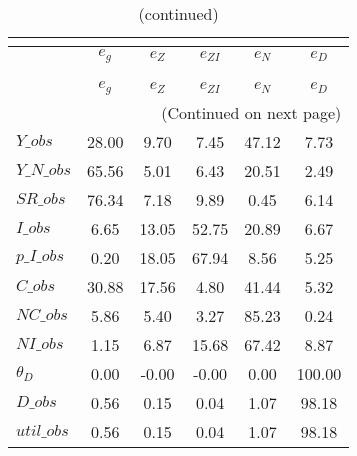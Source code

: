  
\begin{center}
\begin{longtable}{lccccc} 
\caption{VARIANCE DECOMPOSITION (in percent)}\\
 \label{Table:th_var_decomp_uncond}\\
\toprule 
$            $	 & 	 $       {e_g}$	 & 	 $       {e_Z}$	 & 	 $    {e_{ZI}}$	 & 	 $       {e_N}$	 & 	 $       {e_D}$\\
\midrule \endfirsthead 
\caption{(continued)}\\
 \toprule \\ 
$            $	 & 	 $       {e_g}$	 & 	 $       {e_Z}$	 & 	 $    {e_{ZI}}$	 & 	 $       {e_N}$	 & 	 $       {e_D}$\\
\midrule \endhead 
\midrule \multicolumn{6}{r}{(Continued on next page)} \\ \bottomrule \endfoot 
\bottomrule \endlastfoot 
$Y\_obs      $	 & 	       28.00	 & 	        9.70	 & 	        7.45	 & 	       47.12	 & 	        7.73 \\ 
$Y\_N\_obs   $	 & 	       65.56	 & 	        5.01	 & 	        6.43	 & 	       20.51	 & 	        2.49 \\ 
$SR\_obs     $	 & 	       76.34	 & 	        7.18	 & 	        9.89	 & 	        0.45	 & 	        6.14 \\ 
$I\_obs      $	 & 	        6.65	 & 	       13.05	 & 	       52.75	 & 	       20.89	 & 	        6.67 \\ 
$p\_I\_obs   $	 & 	        0.20	 & 	       18.05	 & 	       67.94	 & 	        8.56	 & 	        5.25 \\ 
$C\_obs      $	 & 	       30.88	 & 	       17.56	 & 	        4.80	 & 	       41.44	 & 	        5.32 \\ 
$NC\_obs     $	 & 	        5.86	 & 	        5.40	 & 	        3.27	 & 	       85.23	 & 	        0.24 \\ 
$NI\_obs     $	 & 	        1.15	 & 	        6.87	 & 	       15.68	 & 	       67.42	 & 	        8.87 \\ 
${\theta_D}  $	 & 	        0.00	 & 	       -0.00	 & 	       -0.00	 & 	        0.00	 & 	      100.00 \\ 
$D\_obs      $	 & 	        0.56	 & 	        0.15	 & 	        0.04	 & 	        1.07	 & 	       98.18 \\ 
$util\_obs   $	 & 	        0.56	 & 	        0.15	 & 	        0.04	 & 	        1.07	 & 	       98.18 \\ 
\end{longtable}
 \end{center}
